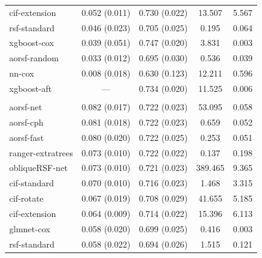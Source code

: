 \documentclass{article}\usepackage[]{graphicx}\usepackage[]{xcolor}
\newenvironment{knitrout}{}{} %
\begin{document}
\begin{knitrout}
\begin{longtable}[t]{lcccc}
\hspace{1em}cif-extension & 0.052 (0.011) & 0.730 (0.022) & 13.507 & 5.567\\
\hspace{1em}rsf-standard & 0.046 (0.023) & 0.705 (0.025) & 0.195 & 0.064\\
\hspace{1em}xgboost-cox & 0.039 (0.051) & 0.747 (0.020) & 3.831 & 0.003\\
\hspace{1em}aorsf-random & 0.033 (0.012) & 0.695 (0.030) & 0.536 & 0.039\\
\hspace{1em}nn-cox & 0.008 (0.018) & 0.630 (0.123) & 12.211 & 0.596\\
\hspace{1em}xgboost-aft & --- & 0.734 (0.020) & 11.525 & 0.006\\
\addlinespace[0.3em]
\multicolumn{5}{l}{\textit{\textbf{GUIDE-IT; HF hospitalization, n = 894, p = 59}}}\\
\hline
\hspace{1em}aorsf-net & 0.082 (0.017) & 0.722 (0.023) & 53.095 & 0.058\\
\hspace{1em}aorsf-cph & 0.081 (0.018) & 0.722 (0.023) & 0.659 & 0.052\\
\hspace{1em}aorsf-fast & 0.080 (0.020) & 0.722 (0.025) & 0.253 & 0.051\\
\hspace{1em}ranger-extratrees & 0.073 (0.010) & 0.722 (0.022) & 0.137 & 0.198\\
\hspace{1em}obliqueRSF-net & 0.073 (0.010) & 0.721 (0.023) & 389.465 & 9.365\\
\hspace{1em}cif-standard & 0.070 (0.010) & 0.716 (0.023) & 1.468 & 3.315\\
\hspace{1em}cif-rotate & 0.067 (0.019) & 0.708 (0.029) & 41.655 & 5.185\\
\hspace{1em}cif-extension & 0.064 (0.009) & 0.714 (0.022) & 15.396 & 6.113\\
\hspace{1em}glmnet-cox & 0.058 (0.020) & 0.699 (0.025) & 0.416 & 0.003\\
\hspace{1em}rsf-standard & 0.058 (0.022) & 0.694 (0.026) & 1.515 & 0.121\\

\end{longtable}
\end{knitrout}
\end{document}
